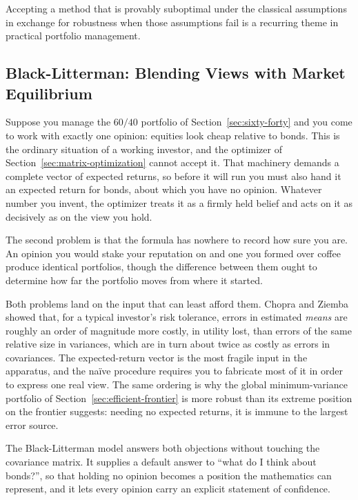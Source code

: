 \documentclass[../ai_in_finance]{subfiles}
\begin{document}
Accepting a method that is provably suboptimal under the classical assumptions in exchange for robustness when those assumptions fail is a recurring theme in practical portfolio management.

\subsection{Black-Litterman: Blending Views with Market Equilibrium}
\label{sec:black-litterman}

Suppose you manage the $60/40$ portfolio of Section~\ref{sec:sixty-forty} and you come to work with exactly one opinion: equities look cheap relative to bonds. This is the ordinary situation of a working investor, and the optimizer of Section~\ref{sec:matrix-optimization} cannot accept it. That machinery demands a complete vector of expected returns, so before it will run you must also hand it an expected return for bonds, about which you have no opinion. Whatever number you invent, the optimizer treats it as a firmly held belief and acts on it as decisively as on the view you hold.

The second problem is that the formula has nowhere to record how sure you are. An opinion you would stake your reputation on and one you formed over coffee produce identical portfolios, though the difference between them ought to determine how far the portfolio moves from where it started.

Both problems land on the input that can least afford them. Chopra and Ziemba showed that, for a typical investor's risk tolerance, errors in estimated \emph{means} are roughly an order of magnitude more costly, in utility lost, than errors of the same relative size in variances, which are in turn about twice as costly as errors in covariances. The expected-return vector is the most fragile input in the apparatus, and the na\"ive procedure requires you to fabricate most of it in order to express one real view. The same ordering is why the global minimum-variance portfolio of Section~\ref{sec:efficient-frontier} is more robust than its extreme position on the frontier suggests: needing no expected returns, it is immune to the largest error source.

The Black-Litterman model answers both objections without touching the covariance matrix. It supplies a default answer to ``what do I think about bonds?'', so that holding no opinion becomes a position the mathematics can represent, and it lets every opinion carry an explicit statement of confidence.
\end{document}
